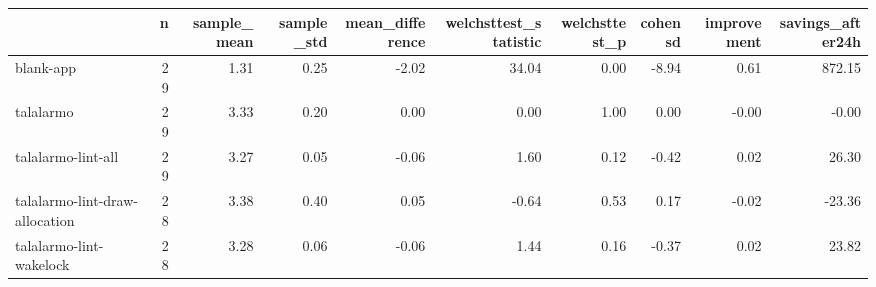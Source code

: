 \begin{tabular}{lrrrrrrrrr}
\toprule
{} &   n &  sample\_mean &  sample\_std &  mean\_difference &  welchsttest\_statistic &  welchsttest\_p &  cohensd &  improvement &  savings\_after24h \\
\midrule
blank-app                      &  29 &         1.31 &        0.25 &            -2.02 &                  34.04 &           0.00 &    -8.94 &         0.61 &            872.15 \\
talalarmo                      &  29 &         3.33 &        0.20 &             0.00 &                   0.00 &           1.00 &     0.00 &        -0.00 &             -0.00 \\
talalarmo-lint-all             &  29 &         3.27 &        0.05 &            -0.06 &                   1.60 &           0.12 &    -0.42 &         0.02 &             26.30 \\
talalarmo-lint-draw-allocation &  28 &         3.38 &        0.40 &             0.05 &                  -0.64 &           0.53 &     0.17 &        -0.02 &            -23.36 \\
talalarmo-lint-wakelock        &  28 &         3.28 &        0.06 &            -0.06 &                   1.44 &           0.16 &    -0.37 &         0.02 &             23.82 \\
\bottomrule
\end{tabular}
